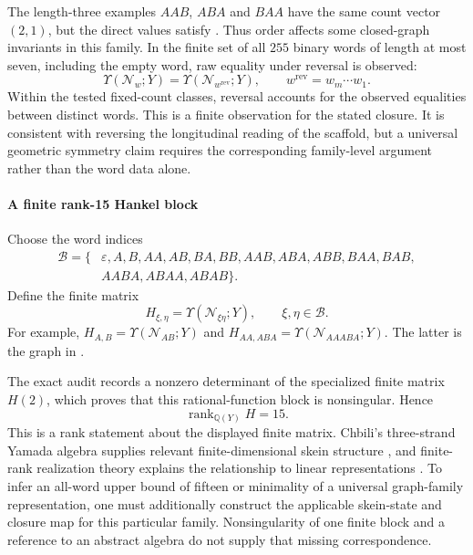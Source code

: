 The length-three examples $AAB$, $ABA$ and $BAA$ have the same count vector $(2,1)$, but the direct values satisfy . Thus order affects some closed-graph invariants in this family. In the finite set of all $255$ binary words of length at most seven, including the empty word, raw equality under reversal is observed:
\begin{equation}
\Upsilon(\mathcal N_w;Y)=\Upsilon(\mathcal N_{w^{\mathrm{rev}}};Y),\qquad w^{\mathrm{rev}}=w_m\cdots w_1.
\label{supp:deriv:eq:observed_reversal}
\end{equation}
Within the tested fixed-count classes, reversal accounts for the observed equalities between distinct words. This is a finite observation for the stated closure. It is consistent with reversing the longitudinal reading of the scaffold, but a universal geometric symmetry claim requires the corresponding family-level argument rather than the word data alone.

\paragraph{A finite rank-15 Hankel block}
\label{supp:transfer_hankel_intuition}
Choose the word indices
\begin{equation}
\begin{aligned}
\mathcal B=\{&\varepsilon,A,B,AA,AB,BA,BB,AAB,ABA,ABB,BAA,BAB,\\
&AABA,ABAA,ABAB\}.
\end{aligned}
\label{supp:deriv:eq:hankel_basis}
\end{equation}
Define the finite matrix
\begin{equation}
H_{\xi,\eta}=\Upsilon(\mathcal N_{\xi\eta};Y),\qquad\xi,\eta\in\mathcal B.
\label{supp:deriv:eq:H_definition}
\end{equation}
For example, $H_{A,B}=\Upsilon(\mathcal N_{AB};Y)$ and $H_{AA,ABA}=\Upsilon(\mathcal N_{AAABA};Y)$. The latter is the graph in .

The exact audit records a nonzero determinant of the specialized finite matrix $H(2)$, which proves that this rational-function block is nonsingular. Hence
\begin{equation}
\boxed{\operatorname{rank}_{\mathbb Q(Y)}H=15.}
\label{supp:deriv:eq:hankel_rank_15}
\end{equation}
This is a rank statement about the displayed finite matrix. Chbili's three-strand Yamada algebra supplies relevant finite-dimensional skein structure \cite{kg_chbili2016}, and finite-rank realization theory explains the relationship to linear representations \cite{kg_carlyle1971realizations,kg_balle2012spectral}. To infer an all-word upper bound of fifteen or minimality of a universal graph-family representation, one must additionally construct the applicable skein-state and closure map for this particular family. Nonsingularity of one finite block and a reference to an abstract algebra do not supply that missing correspondence.

